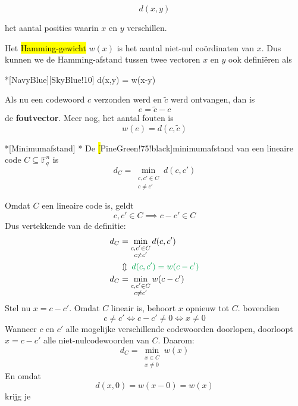 \begin{equation*}
    d(x,y)
\end{equation*}

het aantal posities waarin $x$ en $y$ verschillen.

Het \hl{Hamming-gewicht} $w(x)$ is het aantal niet-nul coördinaten van $x$. Dus kunnen we de Hamming-afstand tussen twee vectoren $x$ en $y$ ook definiëren als

\begin{equationbox}*[NavyBlue][SkyBlue!10]
    d(x,y) = w(x-y)
\end{equationbox}

Als nu een codewoord $c$ verzonden werd en $\tilde{c}$ werd ontvangen, dan is
\begin{equation*}
    e = \tilde{c} - c
\end{equation*}
de \textbf{foutvector}. Meer nog, het aantal fouten is
\begin{equation*}
    w(e) = d(c, \tilde{c})
\end{equation*}

\begin{nicedefinition}*[Minimumafstand]
    \nextpart[]*
    De \hl[PineGreen!75!black]{minimumafstand} van een lineaire code $C \subseteq \mathbb{F}_q^n$ is
    \begin{equation*}
        d_C = \min_{\substack{c,c' \in C \\ c \ne c'}} d(c, c')
    \end{equation*}
\end{nicedefinition}

Omdat $C$ een lineaire code is, geldt
\begin{equation*}
    c, c' \in C \implies c - c' \in C
\end{equation*}
Dus vertekkende van de definitie:
\begin{equation*}
    \begin{aligned}
        d_C &= \min_{\substack{c,c' \in C \\ c \ne c'}} d(c, c') \\
        &\Updownarrow \textcolor{Green}{\;d(c, c') = w(c - c')} \\
        d_C &= \min_{\substack{c,c' \in C \\ c \ne c'}} w(c - c')
    \end{aligned}
\end{equation*}
Stel nu $x = c-c'$. Omdat $C$ lineair is, behoort $x$ opnieuw tot $C$. bovendien
\begin{equation*}
    c \ne c' \iff c - c' \ne 0 \iff x \ne 0
\end{equation*}
Wanneer $c$ en $c'$ alle mogelijke verschillende codewoorden doorlopen, doorloopt $x=c-c'$ alle niet-nulcodewoorden van $C$. Daarom:
\begin{equation*}
    d_C = \min_{\substack{x \in C \\ x \ne 0}} w(x)
\end{equation*}
En omdat
\begin{equation*}
    d(x, 0) = w(x-0) = w(x)
\end{equation*}
krijg je

